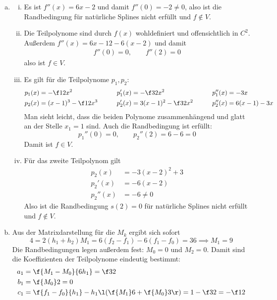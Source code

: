 \documentclass[a4paper]{scrartcl}
\begin{document}
\begin{aufgabe}
	\begin{enumerate}[a)]
		\item
			\begin{enumerate}[i)]
				\item
					Es ist $f''(x) = 6x-2$ und damit $f''(0) = -2 \neq 0$, also ist die Randbedingung für natürliche Splines nicht erfüllt und $f\not\in V$.
				\item
					Die Teilpolynome sind durch $f(x)$ wohldefiniert und offensichtlich in $C^2$.
					Außerdem $f''(x) = 6x-12 - 6(x-2)$ und damit
					\begin{align*}
						f''(0) = 0, \qquad	f''(2) = 0
					\end{align*}
					also ist $f\in V$.
				\item
					Es gilt für die Teilpolynome $p_1,p_2$:
					\begin{alignat*}{3}
						p_1(x) &= -\f 12 x^2 & \qquad p_1'(x) &= -\f 32 x^2 & \qquad p_1''(x) &= -3x \\
						p_2(x) &= (x-1)^3 - \f 12 x^3&  \qquad p_2'(x) &= 3(x-1)^2 - \f 32 x^2 & \qquad p_2''(x) &= 6(x-1) -3x
					\end{alignat*}
					Man sieht leicht, dass die beiden Polynome zusammenhängend und glatt an der Stelle $x_1=1$ sind.
					Auch die Randbedingung ist erfüllt:
					\[
						p_1''(0) = 0, \qquad p_2''(2) = 6 - 6 = 0
					\]
					Damit ist $f\in V$.
				\item
					Für das zweite Teilpolynom gilt 
					\begin{align*}
						p_2(x) &= -3(x-2)^2+3 \\
						p_2'(x) &= -6(x-2) \\
						p_2''(x) &= -6 \neq 0
					\end{align*}
					Also ist die Randbedingung $s(2)=0$ für natürliche Splines nicht erfüllt und $f\not\in V$.
			\end{enumerate}
		\item
			Aus der Matrixdarstellung für die $M_k$ ergibt sich sofort
			\[
				4 = 2(h_1+h_2) M_1 = 6(f_2 - f_1) - 6(f_1 - f_0) = 36 \implies M_1 = 9
			\]
			Die Randbedingungen legen außerdem fest: $M_0=0$ und $M_2=0$.
			Damit sind die Koeffizienten der Teilpolynome eindeutig bestimmt:
			\begin{align*}
				a_1 &= \f {M_1-M_0}{6h_1} = \f 32 \\
				b_1 &= \f {M_0}2 = 0 \\
				c_1 &= \f {f_1 - f_0}{h_1} - h_1\l(\f {M_1}6 + \f {M_0}3\r) = 1 - \f 32 = -\f 12 \\

\end{align*}
\end{enumerate}
\end{aufgabe}
\end{document}
